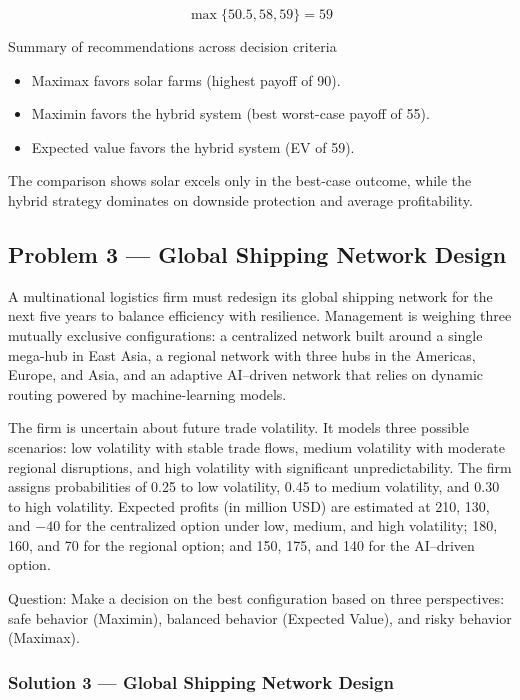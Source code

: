 \[
\max\{50.5, 58, 59\} = 59
\]

Summary of recommendations across decision criteria

\begin{itemize}
	\item Maximax favors solar farms (highest payoff of 90).
	\item Maximin favors the hybrid system (best worst-case payoff of 55).
	\item Expected value favors the hybrid system (EV of 59).
\end{itemize}

The comparison shows solar excels only in the best-case outcome, while the hybrid strategy dominates on downside
protection and average profitability.

\subsection{Problem 3 --- Global Shipping Network Design}\label{subsec:practice-activity-1-problem-3}

A multinational logistics firm must redesign its global shipping network for the next five years to balance efficiency
with resilience. Management is weighing three mutually exclusive configurations: a centralized network built around a
single mega-hub in East Asia, a regional network with three hubs in the Americas, Europe, and Asia, and an adaptive
AI--driven network that relies on dynamic routing powered by machine-learning models.

The firm is uncertain about future trade volatility. It models three possible scenarios: low volatility with stable trade
flows, medium volatility with moderate regional disruptions, and high volatility with significant unpredictability. The
firm assigns probabilities of 0.25 to low volatility, 0.45 to medium volatility, and 0.30 to high volatility. Expected
profits (in million USD) are estimated at 210, 130, and $-40$ for the centralized option under low, medium, and high
volatility; 180, 160, and 70 for the regional option; and 150, 175, and 140 for the AI--driven option.

Question: Make a decision on the best configuration based on three perspectives: safe behavior (Maximin), balanced behavior (Expected Value), and risky behavior (Maximax).

\subsubsection{Solution 3 --- Global Shipping Network Design}\label{subsec:practice-activity-1-solution-3}

